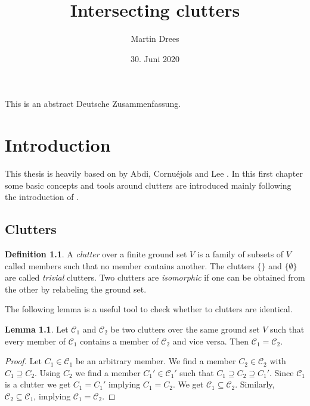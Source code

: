 \documentclass[a4paper, 12pt]{scrbook}
\author{Martin Drees}
\date{30. Juni 2020}
\title{Intersecting clutters}
\theoremstyle{definition}
\newtheorem*{definition}{Definition}
\newtheorem{lemma}[theorem]{Lemma}
\begin{document}
\maketitle
{}
This is an abstract
{\let\cleardoublepage\relax {}}
Deutsche Zusammenfassung.

   \tableofcontents
   \chapter{Introduction}
   This thesis is heavily based on  by Abdi, Cornuéjols and Lee \cite{restrictions}.
   In this first chapter some basic concepts and tools around clutters are introduced mainly following the introduction of \cite{restrictions}.
   \section{Clutters}
   \begin{definition}
       A \emph{clutter} over a finite ground set $V$ is a family of subsets of $V$ called members such that no member contains another.
       The clutters $\{\}$ and $\{\emptyset\}$ are called \emph{trivial} clutters.
       Two clutters are \emph{isomorphic} if one can be obtained from the other by relabeling the ground set.
   \end{definition}
   The following lemma is a useful tool to check whether to clutters are identical.
   \begin{lemma}\label{equalclutters}
       Let $\mathcal{C}_1$ and $\mathcal{C}_2$ be two clutters over the same ground set $V$ such that every member of $\mathcal{C}_1$ contains a member of $\mathcal{C}_2$ and vice versa.
       Then $\mathcal{C}_1=\mathcal{C}_2$.
   \end{lemma}

   \begin{proof}
       Let $C_1 \in \mathcal{C}_1$ be an arbitrary member.
       We find a member $C_2 \in \mathcal{C}_2$ with $C_1 \supseteq C_2$.
       Using $C_2$ we find a member $C_1' \in \mathcal{C}_1'$ such that $C_1 \supseteq C_2 \supseteq C_1'$.
       Since $\mathcal{C}_1$ is a clutter we get $C_1=C_1'$ implying $C_1=C_2$.
       We get $\mathcal{C}_1 \subseteq \mathcal{C}_2$.
       Similarly, $\mathcal{C}_2 \subseteq \mathcal{C}_1$, implying $\mathcal{C}_1=\mathcal{C}_2$.
   \end{proof}
\end{document}
